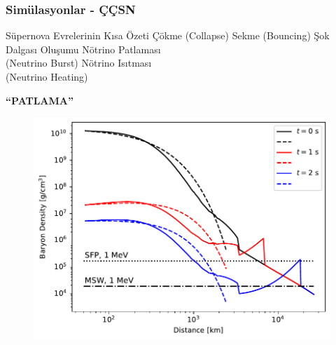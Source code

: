 \documentclass[10pt]{beamer}
\begin{document}
\begin{frame}
    \frametitle{Simülasyonlar - ÇÇSN}
    \begin{minipage}{0.45\textwidth}
        \footnotesize
        \begin{outline}
            \1[\textbullet] Süpernova Evrelerinin Kısa Özeti
            \1[\textbullet] Çökme (Collapse)
            \1[\textbullet] Sekme (Bouncing)
            \1[\textbullet] Şok Dalgası Oluşumu
            \1[\textbullet] Nötrino Patlaması \\(Neutrino Burst)
            \1[\textbullet] Nötrino Isıtması  \\(Neutrino Heating)
        \end{outline}
        \begin{center}
            \textbf{“PATLAMA”}
        \end{center}
        \begin{outline}
        \end{outline}
        \normalsize
    \end{minipage}
    \hfill
    \begin{minipage}{0.45\textwidth}
        \begin{figure}[hbt!]
            \centering
            \includegraphics[width=1.1\textwidth]{fig/baryonDensity.pdf}
        \end{figure}
    \end{minipage}
\end{frame}
\end{document}
